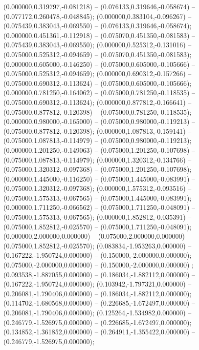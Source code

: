  (0.000000,0.319797,-0.081218) -- (0.076133,0.319646,-0.058674) -- (0.077172,0.260478,-0.048845);
 (0.000000,0.383104,-0.096267) -- (0.075439,0.383043,-0.069550) -- (0.076133,0.319646,-0.058674);
 (0.000000,0.451361,-0.112918) -- (0.075070,0.451350,-0.081583) -- (0.075439,0.383043,-0.069550);
 (0.000000,0.525312,-0.131016) -- (0.075000,0.525312,-0.094659) -- (0.075070,0.451350,-0.081583);
 (0.000000,0.605000,-0.146250) -- (0.075000,0.605000,-0.105666) -- (0.075000,0.525312,-0.094659);
 (0.000000,0.690312,-0.157266) -- (0.075000,0.690312,-0.113624) -- (0.075000,0.605000,-0.105666);
 (0.000000,0.781250,-0.164062) -- (0.075000,0.781250,-0.118535) -- (0.075000,0.690312,-0.113624);
 (0.000000,0.877812,-0.166641) -- (0.075000,0.877812,-0.120398) -- (0.075000,0.781250,-0.118535);
 (0.000000,0.980000,-0.165000) -- (0.075000,0.980000,-0.119213) -- (0.075000,0.877812,-0.120398);
 (0.000000,1.087813,-0.159141) -- (0.075000,1.087813,-0.114979) -- (0.075000,0.980000,-0.119213);
 (0.000000,1.201250,-0.149063) -- (0.075000,1.201250,-0.107698) -- (0.075000,1.087813,-0.114979);
 (0.000000,1.320312,-0.134766) -- (0.075000,1.320312,-0.097368) -- (0.075000,1.201250,-0.107698);
 (0.000000,1.445000,-0.116250) -- (0.075000,1.445000,-0.083991) -- (0.075000,1.320312,-0.097368);
 (0.000000,1.575312,-0.093516) -- (0.075000,1.575313,-0.067565) -- (0.075000,1.445000,-0.083991);
 (0.000000,1.711250,-0.066562) -- (0.075000,1.711250,-0.048091) -- (0.075000,1.575313,-0.067565);
 (0.000000,1.852812,-0.035391) -- (0.075000,1.852812,-0.025570) -- (0.075000,1.711250,-0.048091);
 (0.000000,2.000000,0.000000) -- (0.075000,2.000000,0.000000) -- (0.075000,1.852812,-0.025570);
 (0.083834,-1.953263,0.000000) -- (0.167222,-1.950724,0.000000) -- (0.150000,-2.000000,0.000000);
 (0.075000,-2.000000,0.000000) -- (0.150000,-2.000000,0.000000) ;
 (0.093538,-1.887055,0.000000) -- (0.186034,-1.882112,0.000000) -- (0.167222,-1.950724,0.000000);
 (0.103942,-1.797321,0.000000) -- (0.206081,-1.790406,0.000000) -- (0.186034,-1.882112,0.000000);
 (0.114702,-1.680568,0.000000) -- (0.226685,-1.672497,0.000000) -- (0.206081,-1.790406,0.000000);
 (0.125264,-1.534982,0.000000) -- (0.246779,-1.526975,0.000000) -- (0.226685,-1.672497,0.000000);
 (0.134852,-1.361852,0.000000) -- (0.264911,-1.355422,0.000000) -- (0.246779,-1.526975,0.000000);
